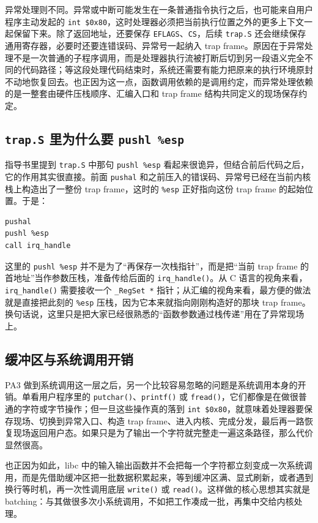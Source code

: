 \documentclass[a4paper]{article}
\begin{document}
异常处理则不同。异常或中断可能发生在一条普通指令执行之后，也可能来自用户程序主动发起的 \texttt{int \$0x80}，这时处理器必须把当前执行位置之外的更多上下文一起保留下来。除了返回地址，还要保存 \texttt{EFLAGS}、\texttt{CS}，后续 \texttt{trap.S} 还会继续保存通用寄存器，必要时还要连错误码、异常号一起纳入 trap frame。原因在于异常处理不是一次普通的子程序调用，而是处理器执行流被打断后切到另一段语义完全不同的代码路径；等这段处理代码结束时，系统还需要有能力把原来的执行环境原封不动地恢复回去。也正因为这一点，函数调用依赖的是调用约定，而异常处理依赖的是一整套由硬件压栈顺序、汇编入口和 trap frame 结构共同定义的现场保存约定。

\subsection{\texttt{trap.S} 里为什么要 \texttt{pushl \%esp}}
指导书里提到 \texttt{trap.S} 中那句 \texttt{pushl \%esp} 看起来很诡异，但结合前后代码之后，它的作用其实很直接。前面 \texttt{pushal} 和之前压入的错误码、异常号已经在当前内核栈上构造出了一整份 trap frame，这时的 \texttt{\%esp} 正好指向这份 trap frame 的起始位置。于是：
\begin{lstlisting}[language={[x86masm]Assembler}]
pushal
pushl %esp
call irq_handle
\end{lstlisting}

这里的 \texttt{pushl \%esp} 并不是为了“再保存一次栈指针”，而是把“当前 trap frame 的首地址”当作参数压栈，准备传给后面的 \texttt{irq\_handle()}。从 C 语言的视角来看，\texttt{irq\_handle()} 需要接收一个 \texttt{\_RegSet *} 指针；从汇编的视角来看，最方便的做法就是直接把此刻的 \texttt{\%esp} 压栈，因为它本来就指向刚刚构造好的那块 trap frame。换句话说，这里只是把大家已经很熟悉的“函数参数通过栈传递”用在了异常现场上。

\subsection{缓冲区与系统调用开销}
PA3 做到系统调用这一层之后，另一个比较容易忽略的问题是系统调用本身的开销。单看用户程序里的 \texttt{putchar()}、\texttt{printf()} 或 \texttt{fread()}，它们都像是在做很普通的字符或字节操作；但一旦这些操作真的落到 \texttt{int \$0x80}，就意味着处理器要保存现场、切换到异常入口、构造 trap frame、进入内核、完成分发，最后再一路恢复现场返回用户态。如果只是为了输出一个字符就完整走一遍这条路径，那么代价显然很高。

也正因为如此，libc 中的输入输出函数并不会把每一个字符都立刻变成一次系统调用，而是先借助缓冲区把一批数据积累起来，等到缓冲区满、显式刷新，或者遇到换行等时机，再一次性调用底层 \texttt{write()} 或 \texttt{read()}。这样做的核心思想其实就是 batching：与其做很多次小系统调用，不如把工作凑成一批，再集中交给内核处理。
\end{document}
